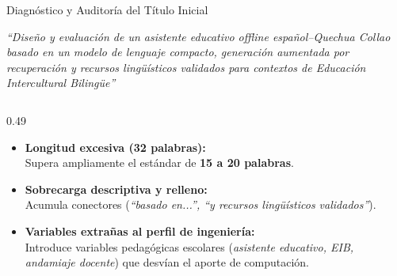 \documentclass[aspectratio=169, 10pt, spanish]{beamer}
\begin{document}
\begin{frame}{Diagnóstico y Auditoría del Título Inicial}
    \vspace{-0.3cm}
    \begin{tcolorbox}[enhanced, colback=bpRed!5!white, colframe=bpRed, title=\textbf{Título Inicial (En revisión en el Plan de Tesis)}, arc=1.5mm, left=2mm, right=2mm, top=1.2mm, bottom=1.2mm]
        \scriptsize\itshape
        ``Diseño y evaluación de un asistente educativo offline español--Quechua Collao basado en un modelo de lenguaje compacto, generación aumentada por recuperación y recursos lingüísticos validados para contextos de Educación Intercultural Bilingüe''
    \end{tcolorbox}

    \vspace{0.15cm}
    \begin{columns}[T]
        \begin{column}{0.49\textwidth}
            \begin{tcolorbox}[enhanced, colback=white, colframe=bpRed!80!black, title=\textbf{Bugs Detectados (Checklist)}, arc=1.5mm, left=2mm, right=2mm, top=1.5mm, bottom=1.5mm]
                \tiny
                \begin{itemize}
                    \item[\color{bpRed}\bfseries $\times$] \textbf{Longitud excesiva (32 palabras):}\\
                    Supera ampliamente el estándar de \textbf{15 a 20 palabras}.
                    \item[\color{bpRed}\bfseries $\times$] \textbf{Sobrecarga descriptiva y relleno:}\\
                    Acumula conectores (\textit{``basado en...'', ``y recursos lingüísticos validados''}).
                    \item[\color{bpRed}\bfseries $\times$] \textbf{Variables extrañas al perfil de ingeniería:}\\
                    Introduce variables pedagógicas escolares (\textit{asistente educativo, EIB, andamiaje docente}) que desvían el aporte de computación.
                \end{itemize}
            \end{tcolorbox}
        \end{column}
        

\end{columns}
\end{frame}
\end{document}

